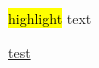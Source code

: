 \documentclass{article}
\begin{document}
 \hl{highlight} text
\LARGE
 \makeatletter

 \def\SOUL@ulleaders{%
     \leaders\hbox{%
      \textcolor{green}{\rule{2pt}{3.5ex}}%
      }\relax
 }

 \def\SOUL@uleveryspace#1{%
     \SOUL@ulcolor{%
         #1%
         \leaders\hrule\@depth 0pt\@height\SOUL@ulht
         \hskip\spaceskip
     }%
     \null
 }


 \LARGE\ul{\Large test}
 
\end{document}
